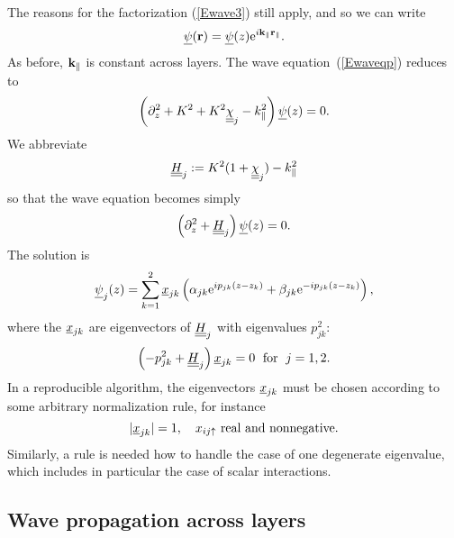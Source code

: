The reasons for the factorization (\ref{Ewave3}) still apply,
and so we can write
\begin{equation}\label{Ewave3p}
\underline{\psi}(\mathbf{r}) = \underline{\psi}(z) \text{e}^{i \mathbf{k}_\parallel\mathbf{r}_\parallel}.
\end{equation}
As before, $\mathbf{k}_\parallel$ is constant across layers.
The wave equation~(\ref{Ewaveqp}) reduces to 
\begin{equation}\label{Ewavezp}
\left(\partial_z^2 + K^2 + K^2\underline{\underline{\chi}}_j - k_\parallel^2 \right) \underline{\psi}(z) = 0.
\end{equation}
We abbreviate
\begin{equation}
  \underline{\underline{H}}_j := K^2(1+\underline{\underline{\chi}}_j)-k_\parallel^2
\end{equation}
so that the wave equation becomes simply
\begin{equation}\label{Ewaveqp2}
  \left(\partial_z^2 + \underline{\underline{H}}_j\right) \underline{\psi}(z) = 0.
\end{equation}
The solution is
\begin{equation}\label{Epsizp}
  \underline{\psi}_j(z)
  = \sum_{k=1}^2 \underline{x}_{jk}\left(\alpha_{jk}\text{e}^{i p_{jk}(z-z_k)}
                            + \beta_{jk}\text{e}^{-i p_{jk}(z-z_k)}\right),
\end{equation}
where the $\underline{x}_{jk}$ are eigenvectors of $\underline{\underline{H}}_j$
with eigenvalues $p_{jk}^2$:
\begin{equation}
  \left( -p_{jk}^2 + \underline{\underline{H}}_j \right) \underline{x}_{jk} = 0
   \;\text{ for }\;j=1,2.
\end{equation}
In a reproducible algorithm,
the eigenvectors $\underline{x}_{jk}$ must be chosen according to some arbitrary
normalization rule,
for instance
\begin{equation}
  |\underline{x}_{jk}|=1,\quad x_{ij\uparrow} \text{ real and nonnegative}.
\end{equation}
Similarly,
a rule is needed how to handle the case of one degenerate eigenvalue,
which includes in particular the case of scalar interactions.


\subsection{Wave propagation across layers}


